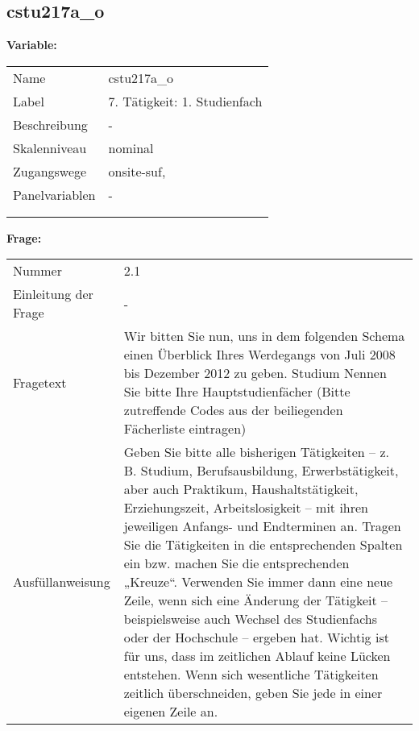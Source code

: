 	
	
	\subsection{cstu217a\_o}
	\label{subSection:cstu217a_o}

	\noindent\textbf{Variable:}\\
		\begin{tabular}{lL{11.3cm}}
			\label{tableVariable:cstu217a_o}
			Name & cstu217a\_o \\
			Label & 7. Tätigkeit: 1. Studienfach \\
			Beschreibung & - \\
			Skalenniveau & nominal \\
			Zugangswege &
				onsite-suf,
 \\
			Panelvariablen & -
			 \\
			 \\
 \\
		\end{tabular}

		\vspace*{1 cm}
		\noindent\textbf{Frage:}\\
		\begin{tabular}{lL{11.3cm}}
			\label{tableQuestion:cstu217a_o}
			Nummer & 2.1 \\
			Einleitung der Frage & - \\
			Fragetext & Wir bitten Sie nun, uns in dem folgenden Schema einen Überblick Ihres Werdegangs von Juli 2008 bis Dezember 2012 zu geben.
Studium
Nennen Sie bitte Ihre Hauptstudienfächer
(Bitte zutreffende Codes aus der beiliegenden Fächerliste eintragen) \\
			Ausfüllanweisung & Geben Sie bitte alle bisherigen Tätigkeiten – z. B. Studium, Berufsausbildung, Erwerbstätigkeit, aber auch Praktikum, Haushaltstätigkeit,
Erziehungszeit, Arbeitslosigkeit – mit ihren jeweiligen Anfangs- und Endterminen an. Tragen Sie die Tätigkeiten in die entsprechenden Spalten ein bzw. machen Sie die entsprechenden „Kreuze“. Verwenden Sie immer dann eine neue Zeile, wenn sich eine Änderung der Tätigkeit – beispielsweise auch Wechsel des Studienfachs oder der Hochschule – ergeben hat. Wichtig ist für uns, dass im zeitlichen Ablauf keine Lücken entstehen. Wenn sich wesentliche Tätigkeiten zeitlich überschneiden, geben Sie jede in einer eigenen Zeile an. \\
		\end{tabular}





